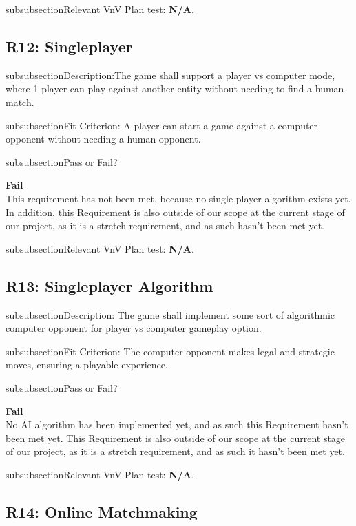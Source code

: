 \documentclass[12pt, titlepage]{article}
\begin{document}
\*subsubsection{Relevant VnV Plan test: } \textbf{N/A}. 

\subsection{R12: Singleplayer} 

\*subsubsection{Description:}The game shall support a player vs computer mode, where 1 player can play against another entity without needing to find a human match.

\*subsubsection{Fit Criterion:} A player can start a game against a computer opponent without needing a human opponent.

\*subsubsection{Pass or Fail?} 

 \noindent \textbf{Fail}\\
 
 \noindent This requirement has not been met, because no single player algorithm exists yet. In addition, this Requirement is also outside of our scope at the current stage of our project, as it is a stretch requirement, and as such hasn't been met yet.

\*subsubsection{Relevant VnV Plan test: } \textbf{N/A}. 

\subsection{R13: Singleplayer Algorithm} 

\*subsubsection{Description:} The game shall implement some sort of algorithmic computer opponent for  player vs computer gameplay option.

\*subsubsection{Fit Criterion:} The computer opponent makes legal and strategic moves, ensuring a playable experience.

\*subsubsection{Pass or Fail?} 

 \noindent \textbf{Fail}\\
 
 \noindent No AI algorithm has been implemented yet, and as such this Requirement hasn't been met yet. This Requirement is also outside of our scope at the current stage of our project, as it is a stretch requirement, and as such it hasn't been met yet.

\*subsubsection{Relevant VnV Plan test: } \textbf{N/A}.

\subsection{R14: Online Matchmaking} 
\end{document}
